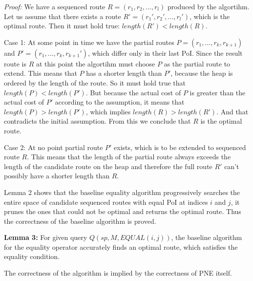 \textit{Proof:} We have a sequenced route $R = (r_1, r_2, ..., r_l)$ produced by the algortihm. Let us assume that there exists a route $R' = (r_1', r_2', ..., r_l')$, which is the optimal route. Then it must hold true: $length(R') < length(R)$. 

Case 1: At some point in time we have the partial routes $P = (r_1, ..., r_k, r_{k+1})$ and $P' = (r_1, ..., r_k, r_{k+1}')$, which differ only in their last PoI. Since the result route is $R$ at this point the algortihm must choose $P$ as the partial route to extend. This means that $P$ has a shorter length than $P'$, because the heap is ordered by the length of the route. So it must hold true that $length(P) < length(P')$. But because the actual cost of $P$ is greater than the actual cost of $P'$ according to the assumption, it means that $length(P) > length(P')$, which implies $length(R) > length(R')$. And that contradicts the initial assumption. From this we conclude that $R$ is the optimal route.

Case 2: At no point partial route $P'$ exists, which is to be extended to sequenced route $R$. This means that the length of the partial route always exceeds the length of the candidate route on the heap and therefore the full route $R'$ can't possibly have a shorter length than $R$.

Lemma 2 shows that the baseline equality algorithm progressively searches the entire space of candidate sequenced routes with equal PoI at indices $i$ and $j$, it prunes the ones that could not be optimal and returns the optimal route. Thus the correctness of the baseline algorithm is proved.

\textbf{Lemma 3:} For given query $Q(sp, M, EQUAL(i, j))$, the baseline algorithm for the equality operator accurately finds an optimal route, which satisfies the equality condition.

The correctness of the algorithm is implied by the correctness of PNE itself.